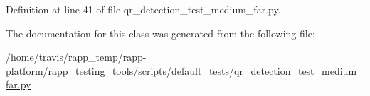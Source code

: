 Definition at line 41 of file qr\-\_\-detection\-\_\-test\-\_\-medium\-\_\-far.\-py.



The documentation for this class was generated from the following file\-:\begin{DoxyCompactItemize}
\item 
/home/travis/rapp\-\_\-temp/rapp-\/platform/rapp\-\_\-testing\-\_\-tools/scripts/default\-\_\-tests/\hyperlink{qr__detection__test__medium__far_8py}{qr\-\_\-detection\-\_\-test\-\_\-medium\-\_\-far.\-py}\end{DoxyCompactItemize}
